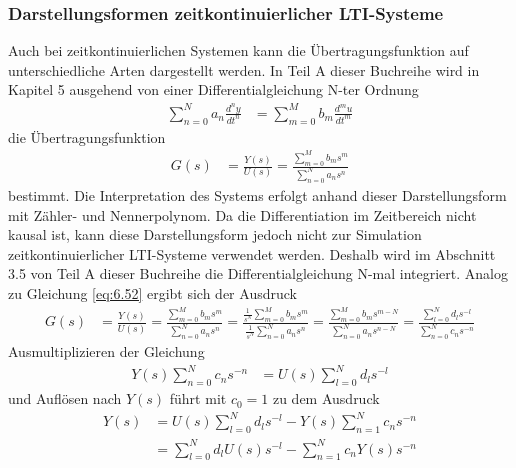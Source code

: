 \subsubsection{Darstellungsformen zeitkontinuierlicher LTI-Systeme}\label{sec:darstellungsformen-zeitkontinuierlicher-lti-systeme}

Auch bei zeitkontinuierlichen Systemen kann die Übertragungsfunktion auf unterschiedliche Arten dargestellt werden. In Teil A dieser Buchreihe wird in Kapitel 5 ausgehend von einer Differentialgleichung N-ter Ordnung
\begin{align}
\sum\limits_{n = 0}^{N}{a_{n}  \frac{d^{n}y}{dt^{n}}} &= \sum\limits_{m = 0}^{M}{b_{m}  \frac{d^{m}u}{dt^{m}}} \label{eq:6.62}
\end{align}
die Übertragungsfunktion
\begin{align}
G(s) &= \frac{Y(s)}{U(s)} = \frac{\sum\limits_{m = 0}^{M}{b_{m}  s^{m}}}{\sum\limits_{n = 0}^{N}{a_{n}  s^{n}}} \label{eq:6.63}
\end{align}
bestimmt. Die Interpretation des Systems erfolgt anhand dieser Darstellungsform mit Zähler- und Nennerpolynom. Da die Differentiation im Zeitbereich nicht kausal ist, kann diese Darstellungsform jedoch nicht zur Simulation zeitkontinuierlicher LTI-Systeme verwendet werden. Deshalb wird im Abschnitt 3.5 von Teil A dieser Buchreihe die Differentialgleichung N-mal integriert. Analog zu Gleichung \eqref{eq:6.52} ergibt sich der Ausdruck
\begin{align}
G(s) &= \frac{Y(s)}{U(s)} = \frac{\sum\limits_{m = 0}^{M}{b_{m}  s^{m}}}{\sum\limits_{n = 0}^{N}{a_{n}  s^{n}}} = \frac{\frac{1}{s^{N}}  \sum\limits_{m = 0}^{M}{b_{m}  s^{m}}}{\frac{1}{s^{N}}  \sum\limits_{n = 0}^{N}{a_{n}  s^{n}}} = \frac{\sum\limits_{m = 0}^{M}{b_{m}  s^{m - N}}}{\sum\limits_{n = 0}^{N}{a_{n}  s^{n - N}}} = \frac{\sum\limits_{l = 0}^{N}{d_{l}  s^{- l}}}{\sum\limits_{n = 0}^{N}{c_{n}  s^{- n}}} \label{eq:6.64}
\end{align}
Ausmultiplizieren der Gleichung
\begin{align}
Y(s)  \sum\limits_{n = 0}^{N}{c_{n}  s^{- n}} &= U(s)  \sum\limits_{l = 0}^{N}{d_{l}  s^{- l}} \label{eq:6.65}
\end{align}
und Auflösen nach \(Y(s)\) führt mit \(c_{0} = 1\) zu dem Ausdruck
\begin{align}
{Y\left(s\right)} &=  {U\left(s\right) \sum\limits _{l=0}^{N}d_{l}  s^{-l}  -Y\left(s\right) \sum\limits _{n=1}^{N}c_{n}  s^{-n}  } \\
{} &=  {\sum\limits _{l=0}^{N}d_{l}  U\left(s\right) s^{-l}  -\sum\limits _{n=1}^{N}c_{n}  Y\left(s\right) s^{-n}  }
\label{eq:6.66}
\end{align}
